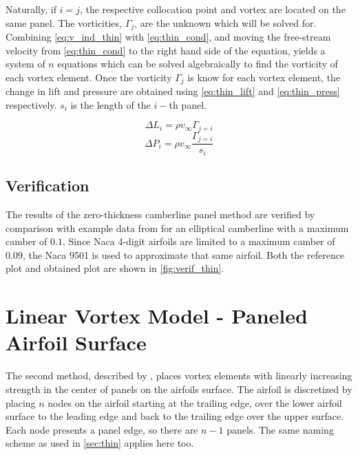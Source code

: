 Naturally, if $i=j$, the respective collocation point and vortex are located
on the same panel. The vorticities, $\Gamma_j$, are the unknown which will be solved for.
Combining \autoref{eq:v_ind_thin} with \autoref{eq:thin_cond}, and moving the free-stream
velocity from \autoref{eq:thin_cond} to the right hand side of the equation,  yields a
system of $n$ equations which can be solved algebraically to find the vorticity of each vortex element.
Once the vorticity $\Gamma_j$ is know for each vortex element, the change in lift and
pressure are obtained using \autoref{eq:thin_lift} and \autoref{eq:thin_press} respectively.
 $s_i$ is the length of the $i-$th panel.

\begin{equation}
\label{eq:thin_lift}
\Delta L_i = \rho v_\infty \Gamma_{j=i}
\end{equation}
\begin{equation}
\label{eq:thin_press}
\Delta P_i = \rho v_\infty \frac{\Gamma_{j=i}}{s_i}
\end{equation}

\subsection{Verification}
The results of the zero-thickness camberline panel method are verified by
comparison with example data from \citeauthor{katz_plotkin} for an elliptical
camberline with a maximum camber of $0.1$. Since Naca 4-digit airfoils are
limited to a maximum camber of $0.09$, the Naca 9501 is used to approximate that
same airfoil. Both the reference plot and obtained plot are shown in \autoref{fig:verif_thin}.


\section{Linear Vortex Model - Paneled Airfoil Surface}
\label{sec:thick}
The second method, described by %
\citeauthor{kuethe_chow_1998}\cite{kuethe_chow_1998}, places vortex elements
with linearly increasing strength in the center of panels on the airfoils
surface. The airfoil is discretized by placing $n$ nodes on the airfoil starting
at the trailing edge, over the lower airfoil surface to the leading edge and
back to the trailing edge over the upper surface. Each node presents a panel
edge, so there are $n-1$ panels. The same naming scheme as used in
\autoref{sec:thin} applies here too.

